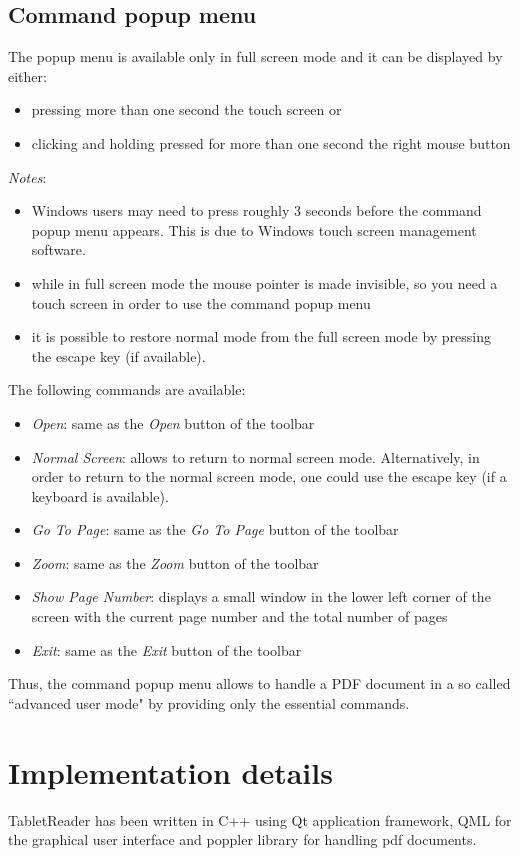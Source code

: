 \documentclass[journal,12pt]{IEEEtran}
\begin{document}
\subsection{Command popup menu}
The popup menu is available only in full screen mode and it can be displayed by either:
\begin{itemize}
 \item pressing more than one second the touch screen or
 \item clicking and holding pressed for more than one second the right mouse button
\end{itemize}

\textit{Notes}: 
\begin{itemize}
 \item Windows users may need to press roughly 3 seconds before the command popup menu appears. This is due to Windows touch screen management software.
 \item while in full screen mode the mouse pointer is made invisible, so you need a touch screen in order to use the command popup menu
 \item it is possible to restore normal mode from the full screen mode by pressing the escape key (if available).
\end{itemize}

The following commands are available:
\begin{itemize}
 \item \textit{Open}: same as the \textit{Open} button of the toolbar
\item \textit{Normal Screen}: allows to return to normal screen mode. Alternatively, in order to return to the normal screen mode, one could use the escape key (if a keyboard is available).
 \item \textit{Go To Page}: same as the \textit{Go To Page} button of the toolbar
 \item \textit{Zoom}: same as the \textit{Zoom} button of the toolbar
 \item \textit{Show Page Number}: displays a small window in the lower left corner of the screen with the current page number and the total number of pages
 \item \textit{Exit}: same as the \textit{Exit} button of the toolbar
\end{itemize}
Thus, the command popup menu allows to handle a PDF document in a so called ``advanced user mode" by providing only the essential commands.

\section{Implementation details}
TabletReader has been written in C++ using Qt application framework, QML for the graphical user interface and poppler library for handling pdf documents. 
\end{document}
